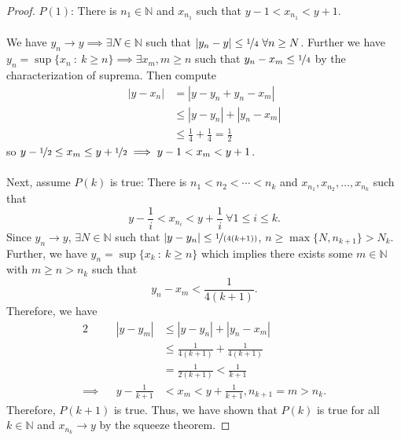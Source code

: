 \documentclass{article}
\newcommand{\N}{\mathbb{N}}
\newcommand{\?}{\stackrel{?}{=}}
\theoremstyle{definition} %
\begin{document}
\begin{itemize}
\begin{proof}
              $P(1)$: There is $n_1 \in \N$ and $x_{n_1}$ such that $y - 1 < x_{n_1} < y + 1$. \\\\
              We have $y_n \rightarrow y \implies \exists N \in \N$ such that $|y_n - y| \leq \nicefrac{1}{4} \ \forall n \geq N$. Further we have $y_n = \sup\{x_n \ : \ k \geq n\} \implies \exists x_m, m \geq n$ such that $y_n - x_m \leq \nicefrac{1}{4}$ by the characterization of suprema. Then compute
              \begin{align*}
                  |y - x_n| & = |y - y_n + y_n - x_m|                      \\
                            & \leq |y - y_n| + |y_n - x_m|                 \\
                            & \leq \frac{1}{4} + \frac{1}{4} = \frac{1}{2}
              \end{align*}
              so $y - \nicefrac{1}{2} \leq x_m \leq y + \nicefrac{1}{2} \implies y - 1 < x_m < y + 1$. \\\\
              Next, assume $P(k)$ is true: There is $n_1 < n_2 < \cdots < n_k$ and $x_{n_1}, x_{n_2}, \ldots, x_{n_k}$ such that
              $$y - \frac{1}{i} < x_{n_i} < y + \frac{1}{i} \ \forall 1 \leq i \leq k.$$
              Since $y_n \rightarrow y$, $\exists N \in \N$ such that $|y - y_n| \leq \nicefrac{1}{(4(k + 1))}$, $n \geq \max\{N, n_{k + 1}\} > N_k$. Further, we have $y_n = \sup\{x_k \ : \ k \geq n\}$ which implies there exists some $m \in \N$ with $m \geq n > n_k$ such that
              $$y_n - x_m < \frac{1}{4(k + 1)}.$$
              Therefore, we have
              \begin{alignat*}{2}
                           &  & |y - y_m|           & \leq |y - y_n| + |y_n - x_m|                      \\
                           &  &                     & \leq \frac{1}{4(k + 1)} + \frac{1}{4(k + 1)}      \\
                           &  &                     & = \frac{1}{2(k + 1)} < \frac{1}{k + 1}            \\
                  \implies &  & y - \frac{1}{k + 1} & < x_m < y + \frac{1}{k + 1}, n_{k + 1} = m > n_k.
              \end{alignat*}
              Therefore, $P(k + 1)$ is true. Thus, we have shown that $P(k)$ is true for all $k \in \N$ and $x_{n_k} \rightarrow y$ by the squeeze theorem.
          \end{proof}

\end{itemize}
\end{document}

